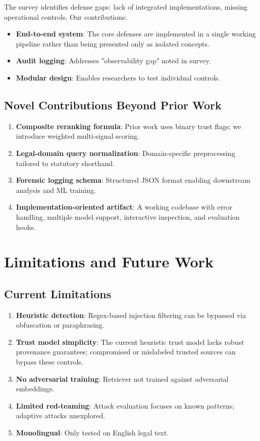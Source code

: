 \documentclass[conference]{IEEEtran}
\begin{document}
The survey identifies defense gaps: lack of integrated implementations, missing operational controls. Our contributions:
\begin{itemize}
    \item \textbf{End-to-end system}: The core defenses are implemented in a single working pipeline rather than being presented only as isolated concepts.
    \item \textbf{Audit logging}: Addresses "observability gap" noted in survey.
    \item \textbf{Modular design}: Enables researchers to test individual controls.
\end{itemize}

\subsection{Novel Contributions Beyond Prior Work}

\begin{enumerate}
    \item \textbf{Composite reranking formula}: Prior work uses binary trust flags; we introduce weighted multi-signal scoring.
    \item \textbf{Legal-domain query normalization}: Domain-specific preprocessing tailored to statutory shorthand.
    \item \textbf{Forensic logging schema}: Structured JSON format enabling downstream analysis and ML training.
    \item \textbf{Implementation-oriented artifact}: A working codebase with error handling, multiple model support, interactive inspection, and evaluation hooks.
\end{enumerate}

\section{Limitations and Future Work}

\subsection{Current Limitations}

\begin{enumerate}
    \item \textbf{Heuristic detection}: Regex-based injection filtering can be bypassed via obfuscation or paraphrasing.
    \item \textbf{Trust model simplicity}: The current heuristic trust model lacks robust provenance guarantees; compromised or mislabeled trusted sources can bypass these controls.
    \item \textbf{No adversarial training}: Retriever not trained against adversarial embeddings.
    \item \textbf{Limited red-teaming}: Attack evaluation focuses on known patterns; adaptive attacks unexplored.
    \item \textbf{Monolingual}: Only tested on English legal text.
\end{enumerate}
\end{document}
